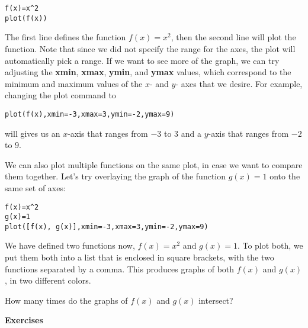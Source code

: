\begin{verbatim}
f(x)=x^2
plot(f(x))
\end{verbatim}

The first line defines the function $f(x)=x^2$, then the second line will plot
the function. Note that since we did not specify the range for the axes, the
plot will automatically pick a range. If we want to see more of the graph, we
can try adjusting the \textbf{xmin}, \textbf{xmax}, \textbf{ymin}, and \textbf{ymax}
values, which correspond to the minimum and maximum values of the
$x$- and $y$- axes that we desire. For example, changing the plot
command to

\begin{verbatim}
plot(f(x),xmin=-3,xmax=3,ymin=-2,ymax=9)
\end{verbatim}

will gives us an $x$-axis that ranges from $-3$ to $3$ and a $y$-axis that
ranges from $-2$ to $9$.

We can also plot multiple functions on the same plot, in case we
want to compare them together. Let's try overlaying the graph of
the function $g(x)=1$ onto the same set of axes:

\begin{verbatim}
f(x)=x^2
g(x)=1
plot([f(x), g(x)],xmin=-3,xmax=3,ymin=-2,ymax=9)
\end{verbatim}

We have defined two functions now, $f(x)=x^2$ and $g(x)=1$. To
plot both, we put them both into a list that is enclosed in square
brackets, with the two functions separated by a comma. This produces
graphs of both $f(x)$ and $g(x)$, in two different colors.

How many times do the graphs of $f(x)$ and $g(x)$ intersect?

{\bf Exercises}

